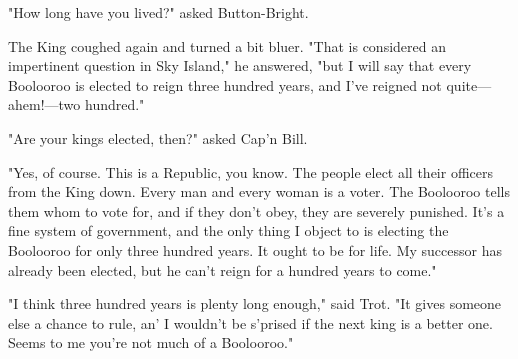 \documentclass{article}
\begin{document}
\sloppy

"How long have you lived?" asked Button-Bright.

The King coughed again and turned a bit bluer. "That is considered
an impertinent question in Sky Island," he answered, "but I will say
that every Boolooroo is elected to reign three hundred years, and
I've reigned not quite---ahem!---two hundred."

"Are your kings elected, then?" asked Cap'n Bill.

"Yes, of course. This is a Republic, you know. The people elect all
their officers from the King down. Every man and every woman is a
voter. The Boolooroo tells them whom to vote for, and if they don't
obey, they are severely punished. It's a fine system of government,
and the only thing I object to is electing the Boolooroo for only
three hundred years. It ought to be for life. My successor has
already been elected, but he can't reign for a hundred years to
come."

"I think three hundred years is plenty long enough," said Trot. "It
gives someone else a chance to rule, an' I wouldn't be s'prised if
the next king is a better one. Seems to me you're not much of a
Boolooroo."
\end{document}
